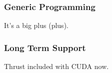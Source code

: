 \documentclass{beamer}
\begin{document}
\begin{frame}
  \frametitle{Generic Programming}
  It's a big plus (plus).
\end{frame}

\begin{frame}
  \frametitle{Long Term Support}
  Thrust included with CUDA now.
\end{frame}
\end{document}
